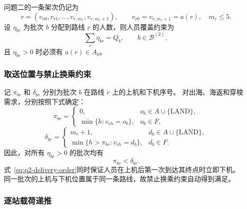 \documentclass[UTF8,a4paper,zihao=5]{ctexart}
\begin{document}
问题二的一条架次仍记为
\begin{equation}
  r=(v_{r0},v_{r1},\ldots,v_{r,m_r},v_{r,m_r+1}),
  \qquad v_{r0}=v_{r,m_r+1}=a(r),\quad m_r\le5.
  \label{eq:q2-route}
\end{equation}
设 $\eta_{br}$ 为批次 $b$ 分配到路线 $r$ 的人数，则人员覆盖约束为
\begin{equation}
  \sum_r\eta_{br}=Q_b,
  \qquad b\in\mathcal{B}^{(2)},
  \label{eq:q2-demand-cover}
\end{equation}
且 $\eta_{br}>0$ 时必须有 $a(r)\in A_b$。

\subsubsection{取送位置与禁止换乘约束}

记 $\pi_{br}$ 和 $\delta_{br}$ 分别为批次 $b$ 在路线 $r$ 上的上机和下机序号。
对出海、海返和穿梭需求，分别按照下式确定：
\begin{equation}
  \pi_{br}=
  \begin{cases}
    0, & o_b\in A\cup\{\mathrm{LAND}\},\\
    \min\{h:v_{rh}=o_b\}, & o_b\in F,
  \end{cases}
  \label{eq:q2-pickup-order}
\end{equation}
\begin{equation}
  \delta_{br}=
  \begin{cases}
    m_r+1, & d_b\in A\cup\{\mathrm{LAND}\},\\
    \min\{h>\pi_{br}:v_{rh}=d_b\}, & d_b\in F.
  \end{cases}
  \label{eq:q2-delivery-order}
\end{equation}
因此，对所有 $\eta_{br}>0$ 的批次均有
\begin{equation}
  \pi_{br}<\delta_{br}.
  \label{eq:q2-precedence}
\end{equation}
式~\eqref{eq:q2-delivery-order}同时保证人员在上机后第一次到达其终点时立即下机。
同一批次的上机与下机位置属于同一条路线，故禁止换乘约束自动得到满足。

\subsubsection{逐站载荷递推}
\end{document}
